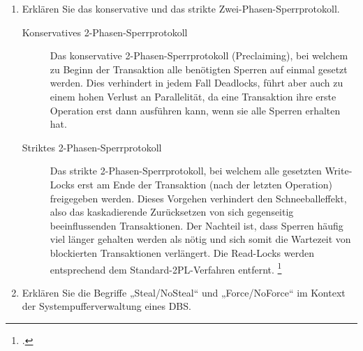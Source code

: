 \documentclass{lehramt-informatik-aufgabe}
\begin{document}
\begin{enumerate}

\item Erklären Sie das konservative und das strikte
Zwei-Phasen-Sperrprotokoll.

\begin{liAntwort}
\begin{description}

\item[Konservatives 2-Phasen-Sperrprotokoll]

Das konservative 2-Phasen-Sperrprotokoll (Preclaiming), bei welchem zu
Beginn der Transaktion alle benötigten Sperren auf einmal gesetzt
werden. Dies verhindert in jedem Fall Deadlocks, führt aber auch zu
einem hohen Verlust an Parallelität, da eine Transaktion ihre erste
Operation erst dann ausführen kann, wenn sie alle Sperren erhalten hat.

\item[Striktes 2-Phasen-Sperrprotokoll]

Das strikte 2-Phasen-Sperrprotokoll, bei welchem alle gesetzten
Write-Locks erst am Ende der Transaktion (nach der letzten Operation)
freigegeben werden. Dieses Vorgehen verhindert den Schneeballeffekt,
also das kaskadierende Zurücksetzen von sich gegenseitig beeinflussenden
Transaktionen. Der Nachteil ist, dass Sperren häufig viel länger
gehalten werden als nötig und sich somit die Wartezeit von blockierten
Transaktionen verlängert. Die Read-Locks werden entsprechend dem
Standard-2PL-Verfahren entfernt.
\footcite{wiki:sperrverfahren}
\end{description}
\end{liAntwort}


\item Erklären Sie die Begriffe „Steal/NoSteal“ und „Force/NoForce“ im
Kontext der Systempufferverwaltung eines DBS.

\end{enumerate}
\end{document}
